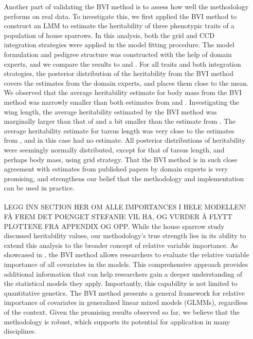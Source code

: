 Another part of validating the BVI method is to assess how well the methodology performs on real data. To investigate this, we first applied the BVI method to construct an LMM to estimate the heritability of three phenotypic traits of a population of house sparrows. In this analysis, both the grid and CCD integration strategies were applied in the model fitting procedure. The model formulation and pedigree structure was constructed with the help of domain experts, and we compare the results to \citet{Silva2017} and \citet{Muff2019Genetic}. For all traits and both integration strategies, the posterior distribution of the heritability from the BVI method covers the estimates from the domain experts, and places them close to the mean. We observed that the average heritability estimate for body mass from the BVI method was narrowly smaller than both estimates from \citet{Silva2017} and \citet{Muff2019Genetic}. Investigating the wing length, the average heritability estimated by the BVI method was marginally larger than that of \citet{Muff2019Genetic} and a bit smaller than the estimate from \citet{Silva2017}. The average heritability estimate for tarsus length was very close to the estimates from \citet{Silva2017}, and in this case \citet{Muff2019Genetic} had no estimate. All posterior distributions of heritability were seemingly normally distributed, except for that of tarsus length, and perhaps body mass, using grid strategy. That the BVI method is in such close agreement with estimates from published papers by domain experts is very promising, and strengthens our belief that the methodology and implementation can be used in practice.
\\
\\
LEGG INN SECTION HER OM ALLE IMPORTANCES I HELE MODELLEN! FÅ FREM DET POENGET STEFANIE VIL HA, OG VURDER Å FLYTT PLOTTENE FRA APPENDIX OG OPP.
While the house sparrow study discussed heritability values, our methodology's true strength lies in its ability to extend this analysis to the broader concept of relative variable importance. As showcased in , the BVI method allows researchers to evaluate the relative variable importance of all covariates in the models. This comprehensive approach provides additional information that can help researchers gain a deeper understanding of the statistical models they apply. Importantly, this capability is not limited to quantitative genetics. The BVI method presents a general framework for relative importance of covariates in generalized linear mixed models (GLMMs), regardless of the context. Given the promising results observed so far, we believe that the methodology is robust, which supports its potential for application in many disciplines.
